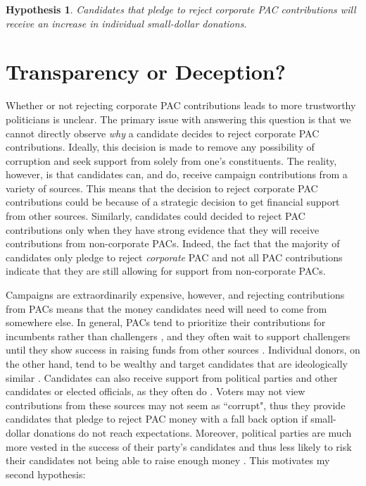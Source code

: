 \documentclass[12pt]{article}
\newtheorem{hyp}{Hypothesis}
\begin{document}
 \begin{hyp}
     Candidates that pledge to reject corporate PAC contributions will receive an increase in individual small-dollar donations. 
 \end{hyp}



\section{Transparency or Deception?}

Whether or not rejecting corporate PAC contributions leads to more trustworthy politicians is unclear. The primary issue with answering this question is that we cannot directly observe \emph{why} a candidate decides to reject corporate PAC contributions. Ideally, this decision is made to remove any possibility of corruption and seek support from solely from one's constituents. The reality, however, is that candidates can, and do, receive campaign contributions from a variety of sources. This means that the decision to reject corporate PAC contributions could be because of a strategic decision to get financial support from other sources. Similarly, candidates could decided to reject PAC contributions only when they have strong evidence that they will receive contributions from non-corporate PACs. Indeed, the fact that the majority of candidates only pledge to reject \emph{corporate} PAC and not all PAC contributions indicate that they are still allowing for support from non-corporate PACs.
 
 Campaigns are extraordinarily expensive, however, and rejecting contributions from PACs means that the money candidates need will need to come from somewhere else. In general, PACs tend to prioritize their contributions for incumbents rather than challengers \citep{brunell2005}, and they often wait to support challengers until they show success in raising funds from other sources \citep{biersack1993}. Individual donors, on the other hand, tend to be wealthy \citep{brown1995} and target candidates that are ideologically similar \citep{bonica2014}. Candidates can also receive support from political parties and other candidates or elected officials, as they often do \citep{wilcox1989, currinder2003}. Voters may not view contributions from these sources may not seem as ``corrupt", thus they provide candidates that pledge to reject PAC money with a fall back option if small-dollar donations do not reach expectations. Moreover, political parties are much more vested in the success of their party's candidates and thus less likely to risk their candidates not being able to raise enough money \citep{herrnson2009}. This motivates my second hypothesis:
 
\end{document}
